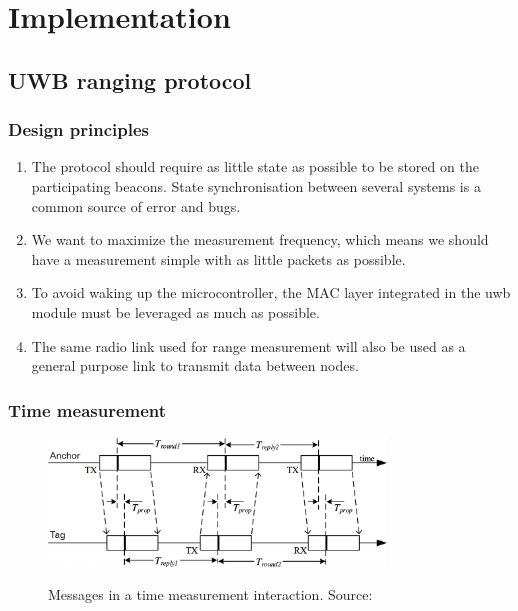 \documentclass[a4paper, 12pt]{scrreprt}
\begin{document}
\chapter{Implementation}

\section{UWB ranging protocol}

\subsection{Design principles}

\begin{enumerate}
    \item The protocol should require as little state as possible to be stored on the participating beacons.
        State synchronisation between several systems is a common source of error and bugs.
    \item We want to maximize the measurement frequency, which means we should have a measurement simple with as little packets as possible.
    \item To avoid waking up the microcontroller, the MAC layer integrated in the \gls{uwb} module must be leveraged as much as possible.
    \item The same radio link used for range measurement will also be used as a general purpose link to transmit data between nodes.
\end{enumerate}

\subsection{Time measurement}

\begin{figure}[h]
    \centering
    \includegraphics[width=0.8\textwidth]{figures/ranging_protocol.png}
    \label{fig:ranging_protocol}
    \caption[Ranging protocol]{Messages in a time measurement interaction. Source:~\cite{dw1000manual}}
\end{figure}
\end{document}
